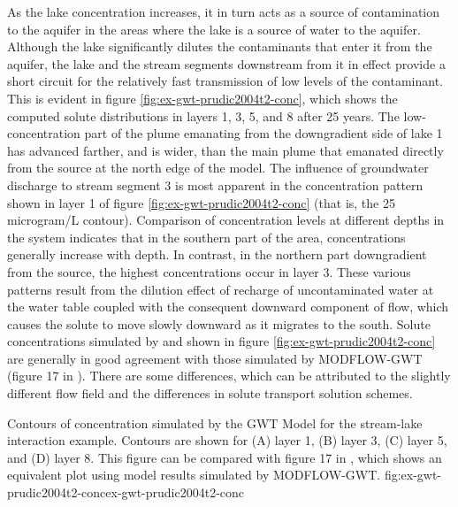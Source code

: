 As the lake concentration increases, it in turn acts as a source of contamination to the aquifer in the areas where the lake is a source of water to the aquifer. Although the lake significantly dilutes the contaminants that enter it from the aquifer, the lake and the stream segments downstream from it in effect provide a short circuit for the relatively fast transmission of low levels of the contaminant. This is evident in figure \ref{fig:ex-gwt-prudic2004t2-conc}, which shows the computed solute distributions in layers 1, 3, 5, and 8 after 25 years. The low-concentration part of the plume emanating from the downgradient side of lake 1 has advanced farther, and is wider, than the main plume that emanated directly from the source at the north edge of the model. The influence of groundwater discharge to stream segment 3 is most apparent in the concentration pattern shown in layer 1 of figure \ref{fig:ex-gwt-prudic2004t2-conc} (that is, the 25 microgram/L contour). Comparison of concentration levels at different depths in the system indicates that in the southern part of the area, concentrations generally increase with depth. In contrast, in the northern part downgradient from the source, the highest concentrations occur in layer 3. These various patterns result from the dilution effect of recharge of uncontaminated water at the water table coupled with the consequent downward component of flow, which causes the solute to move slowly downward as it migrates to the south.  Solute concentrations simulated by \mf and shown in figure \ref{fig:ex-gwt-prudic2004t2-conc} are generally in good agreement with those simulated by MODFLOW-GWT (figure 17 in \cite{modflowsfr1pack}).  There are some differences, which can be attributed to the slightly different flow field and the differences in solute transport solution schemes.

\begin{StandardFigure}{
                                     Contours of concentration simulated by the \mf GWT Model for the stream-lake interaction example.  Contours are shown for (A) layer 1, (B) layer 3, (C) layer 5, and (D) layer 8. This figure can be compared with figure 17 in \cite{modflowsfr1pack}, which shows an equivalent plot using model results simulated by MODFLOW-GWT.
                                     }{fig:ex-gwt-prudic2004t2-conc}{ex-gwt-prudic2004t2-conc}
\end{StandardFigure}            

